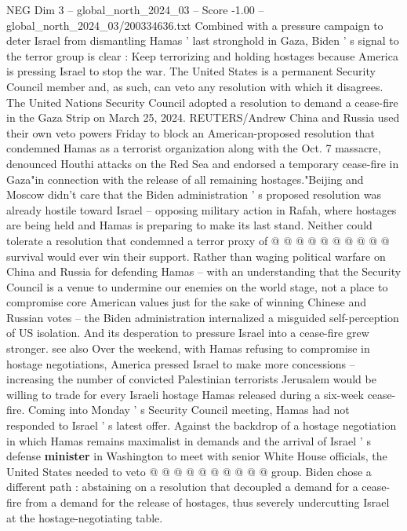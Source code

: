 \begin{textsample}{NEG Dim 3 – global\_north\_2024\_03 – Score -1.00 – global\_north\_2024\_03/200334636.txt}  \label{ex:f3_neg_187}
Combined with a pressure campaign to deter Israel from dismantling Hamas ' last stronghold in Gaza, Biden ' s signal to the terror group is clear : Keep terrorizing and holding hostages because America is pressing Israel to stop the war.
The United States is a permanent Security Council member and, as such, can veto any resolution with which it disagrees.
The United Nations Security Council adopted a resolution to demand a cease-fire in the Gaza Strip on March 25, 2024.
REUTERS/Andrew China and Russia used their own veto powers Friday to block an American-proposed resolution that condemned Hamas as a terrorist organization along with the Oct. 7 massacre, denounced Houthi attacks on the Red Sea and endorsed a temporary cease-fire in Gaza"in connection with the release of all remaining hostages."Beijing and Moscow didn't care that the Biden administration ' s proposed resolution was already hostile toward Israel -- opposing military action in Rafah, where hostages are being held and Hamas is preparing to make its last stand.
Neither could tolerate a resolution that condemned a terror proxy of @ @ @ @ @ @ @ @ @ @ survival would ever win their support.
Rather than waging political warfare on China and Russia for defending Hamas -- with an understanding that the Security Council is a venue to undermine our enemies on the world stage, not a place to compromise core American values just for the sake of winning Chinese and Russian votes -- the Biden administration internalized a misguided self-perception of US isolation.
And its desperation to pressure Israel into a cease-fire grew stronger. see also Over the weekend, with Hamas refusing to compromise in hostage negotiations, America pressed Israel to make more concessions -- increasing the number of convicted Palestinian terrorists Jerusalem would be willing to trade for every Israeli hostage Hamas released during a six-week cease-fire.
Coming into Monday ' s Security Council meeting, Hamas had not responded to Israel ' s latest offer.
Against the backdrop of a hostage negotiation in which Hamas remains maximalist in demands and the arrival of Israel ' s defense \textbf{minister} in Washington to meet with senior White House officials, the United States needed to veto @ @ @ @ @ @ @ @ @ @ group.
Biden chose a different path : abstaining on a resolution that decoupled a demand for a cease-fire from a demand for the release of hostages, thus severely undercutting Israel at the hostage-negotiating table.

\end{textsample}
